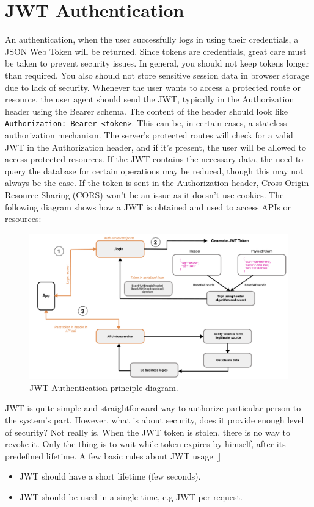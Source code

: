 \section{JWT Authentication}\label{sec:jwt-authentication}
An authentication, when the user successfully logs in using their credentials, a JSON Web Token will be returned.
Since tokens are credentials, great care must be taken to prevent security issues.
In general, you should not keep tokens longer than required.
You also should not store sensitive session data in browser storage due to lack of security.
Whenever the user wants to access a protected route or resource, the user agent should send the JWT,
typically in the Authorization header using the Bearer schema.
The content of the header should look like \texttt{Authorization: Bearer <token>}.
This can be, in certain cases, a stateless authorization mechanism.
The server's protected routes will check for a valid JWT in the Authorization header, and if it's present, the user
will be allowed to access protected resources.
If the JWT contains the necessary data, the need to query the database for certain operations may be reduced, though
this may not always be the case.
If the token is sent in the Authorization header, Cross-Origin Resource Sharing (CORS) won't be an issue as it doesn't
use cookies.
The following diagram shows how a JWT is obtained and used to access APIs or resources:
\begin{figure}[H]
    \centering
    \includegraphics[width=1\textwidth]{Pictures/jwt_auth_scheme.pdf}
    \caption{JWT Authentication principle diagram.}\label{fig:figure3}
\end{figure}
JWT is quite simple and straightforward way to authorize particular person to the system's part.
However, what is about security, does it provide enough level of security?
Not really is.
When the JWT token is stolen, there is no way to revoke it.
Only the thing is to wait while token expires by himself, after its predefined lifetime.
A few basic rules about JWT usage [\cite{RDegges}]
\begin{itemize}
    \item JWT should have a short lifetime (few seconds).
    \item JWT should be used in a single time, e.g JWT per request.
\end{itemize}